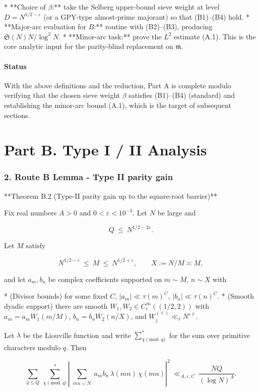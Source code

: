 \documentclass[11pt]{article}
\theoremstyle{definition}
\theoremstyle{remark}
\begin{document}
* **Choice of $\beta$:** take the Selberg upper-bound sieve weight at level $D=N^{1/2-\varepsilon}$ (or a GPY-type almost-prime majorant) so that (B1)–(B4) hold.
* **Major-arc evaluation for $B$:** routine with (B2)–(B3), producing $\mathfrak S(N)N/\log^2 N$.
* **Minor-arc task:** prove the $L^2$ estimate (A.1). This is the core analytic input for the parity-blind replacement on $\mathfrak m$.


\subsection*{Status} 
With the above definitions and the reduction, Part A is complete modulo verifying that the chosen sieve weight $\beta$ satisfies (B1)–(B4) (standard) and establishing the minor-arc bound (A.1), which is the target of subsequent sections.

\part*{Part B. Type I / II Analysis}

\section*{2. Route B Lemma - Type II parity gain}

**Theorem B.2 (Type-II parity gain up to the square-root barrier)**

Fix real numbers $A>0$ and $0<\varepsilon<10^{-3}$. Let $N$ be large and

$$
Q\ \le\ N^{1/2-2\varepsilon}.
$$

Let $M$ satisfy

$$
N^{1/2-\varepsilon}\ \le\ M\ \le\ N^{1/2+\varepsilon},\qquad X:=N/M\asymp M,
$$

and let $a_m,b_n$ be complex coefficients supported on $m\sim M$, $n\sim X$ with

* (Divisor bounds) for some fixed $C$, $|a_m|\ll \tau(m)^C$, $|b_n|\ll \tau(n)^C$.
* (Smooth dyadic support) there are smooth $W_1,W_2\in C_c^\infty((1/2,2))$ with $a_m=a_m W_1(m/M)$, $b_n=b_n W_2(n/X)$, and $W_j^{(\ell)}\ll_\ell N^{\varepsilon \ell}$.

Let $\lambda$ be the Liouville function and write $\sum_{\chi\!\!\!\pmod q}^{\!*}$ for the sum over primitive characters modulo $q$. Then

$$
\boxed{\quad
\sum_{q\le Q}\ \sum_{\chi\!\!\!\pmod q}^{\!*}
\left|\sum_{\substack{mn\asymp N}} a_m b_n\,\lambda(mn)\,\chi(mn)\right|^2
\ \ll_{A,\varepsilon,C}\ \frac{NQ}{(\log N)^{A}}.
\quad}
$$
\end{document}
